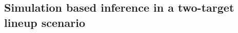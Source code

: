 \documentclass[12pt]{article}\usepackage[]{graphicx}\usepackage[]{color}
\begin{document}
\begin{appendix}

\section{Simulation based inference in a two-target lineup scenario}\label{sec:simulation}


\end{appendix}
\end{document}
